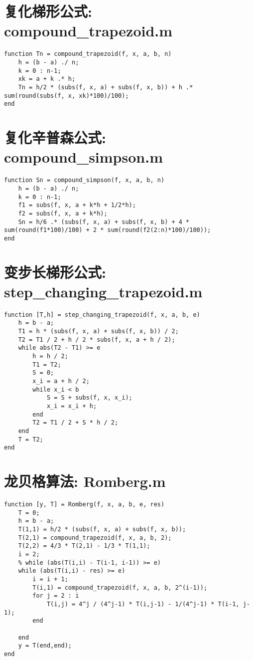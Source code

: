 \section*{复化梯形公式: compound\_trapezoid.m}
\lstset{language=Matlab}

\begin{lstlisting}
function Tn = compound_trapezoid(f, x, a, b, n)
    h = (b - a) ./ n;
    k = 0 : n-1;
    xk = a + k .* h;
    Tn = h/2 * (subs(f, x, a) + subs(f, x, b)) + h .* sum(round(subs(f, x, xk)*100)/100);
end
\end{lstlisting}

\section*{复化辛普森公式: compound\_simpson.m}
\lstset{language=Matlab}
\begin{lstlisting}
function Sn = compound_simpson(f, x, a, b, n)
    h = (b - a) ./ n;
    k = 0 : n-1;
    f1 = subs(f, x, a + k*h + 1/2*h);
    f2 = subs(f, x, a + k*h);
    Sn = h/6 .* (subs(f, x, a) + subs(f, x, b) + 4 * sum(round(f1*100)/100) + 2 * sum(round(f2(2:n)*100)/100));
end
\end{lstlisting}

\section*{变步长梯形公式: step\_changing\_trapezoid.m}
\lstset{language=Matlab}
\begin{lstlisting}
function [T,h] = step_changing_trapezoid(f, x, a, b, e)
    h = b - a;
    T1 = h * (subs(f, x, a) + subs(f, x, b)) / 2;
    T2 = T1 / 2 + h / 2 * subs(f, x, a + h / 2);
    while abs(T2 - T1) >= e
        h = h / 2;
        T1 = T2;
        S = 0;
        x_i = a + h / 2;
        while x_i < b
            S = S + subs(f, x, x_i);
            x_i = x_i + h;
        end
        T2 = T1 / 2 + S * h / 2;
    end
    T = T2;
end
\end{lstlisting}

\section*{龙贝格算法: Romberg.m}
\lstset{language=Matlab}
\begin{lstlisting}
function [y, T] = Romberg(f, x, a, b, e, res)
    T = 0;
    h = b - a;
    T(1,1) = h/2 * (subs(f, x, a) + subs(f, x, b));
    T(2,1) = compound_trapezoid(f, x, a, b, 2);
    T(2,2) = 4/3 * T(2,1) - 1/3 * T(1,1);
    i = 2;
    % while (abs(T(i,i) - T(i-1, i-1)) >= e)
    while (abs(T(i,i) - res) >= e)
        i = i + 1;
        T(i,1) = compound_trapezoid(f, x, a, b, 2^(i-1));
        for j = 2 : i
            T(i,j) = 4^j / (4^j-1) * T(i,j-1) - 1/(4^j-1) * T(i-1, j-1);
        end

    end
    y = T(end,end);
end
\end{lstlisting}

